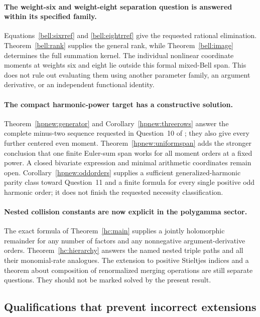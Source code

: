\documentclass[11pt,a4paper]{article}
\numberwithin{equation}{section}
\theoremstyle{definition}
\theoremstyle{remark}
\begin{document}
\paragraph{The weight-six and weight-eight separation question is answered
within its specified family.}
Equations~\eqref{bell:sixrref} and \eqref{bell:eightrref} give the
requested rational elimination. Theorem~\ref{bell:rank} supplies the
general rank, while Theorem~\ref{bell:image} determines the full
summation kernel. The individual nonlinear coordinate moments at
weights six and eight lie outside this formal mixed-Bell span.
This does not rule out evaluating them using another parameter family,
an argument derivative, or an independent functional identity.

\paragraph{The compact harmonic-power target has a constructive solution.}
Theorem~\ref{hpnew:generator} and
Corollary~\ref{hpnew:threerows} answer the complete minus-two sequence
requested in Question~10 of \cite{RepoExactResonant}; they also give
every further centered even moment. Theorem~\ref{hpnew:uniformspan}
adds the stronger conclusion that one finite Euler-sum span works for
all moment orders at a fixed power. A closed bivariate expression and
minimal arithmetic coordinates remain open.
Corollary~\ref{hpnew:oddorders} supplies a sufficient generalized-harmonic
parity class toward Question~11 and a finite formula for every single
positive odd harmonic order; it does not finish the requested necessity
classification.

\paragraph{Nested collision constants are now explicit in the polygamma
sector.}
The exact formula of Theorem~\ref{hc:main} supplies a jointly
holomorphic remainder for any number of factors and any nonnegative
argument-derivative orders. Theorem~\ref{hc:hierarchy} answers the
named nested triple paths and all their monomial-rate analogues.
The extension to positive Stieltjes indices and a theorem about
composition of renormalized merging operations are still separate
questions. They should not be marked solved by the present result.

\subsection{Qualifications that prevent incorrect extensions}
\end{document}
